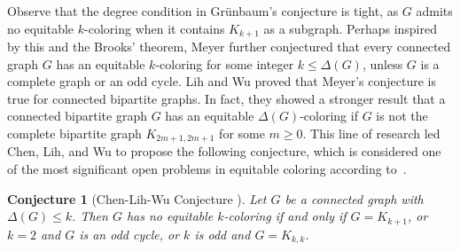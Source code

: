 \documentclass[11pt, a4paper]{article}
\newtheorem{conj}[theorem]{Conjecture}
\theoremstyle{definition}
\newcommand{\<}{\subseteq}
\begin{document}
Observe that the degree condition in Gr\"{u}nbaum's conjecture is tight, as $G$ admits no equitable $k$-coloring when it contains $K_{k+1}$ as a subgraph. Perhaps inspired by this and the Brooks' theorem,  Meyer \cite{M1973} further conjectured that every connected graph $G$  has an equitable {$k$-coloring for some integer $k\leq \Delta(G)$}, unless $G$ is a complete graph or an odd cycle. Lih and Wu \cite{LW1991} proved that Meyer's conjecture is true for connected bipartite graphs. In fact, they showed a stronger result that a connected bipartite graph $G$ has an equitable $\Delta(G)$-coloring if $G$ is not the complete bipartite graph $K_{2m+1,2m+1}$ for some $m\geq 0$. This line of research led Chen, Lih, and Wu \cite{CLW1994} to propose the following conjecture, which is considered one of the most significant open problems in equitable coloring according to~\cite{kierstead-survey}.

\begin{conj}[Chen-Lih-Wu Conjecture \cite{CLW1994}] \label{CLW}
    Let $G$ be a connected
graph with $\Delta(G)\leq k$. Then $G$ has no equitable $k$-coloring if and only if  $G=K_{k+1}$, or  $k=2$ and $G$ is an odd cycle,
or $k$ is odd and $G=K_{k,k}$.
\end{conj}
\end{document}
